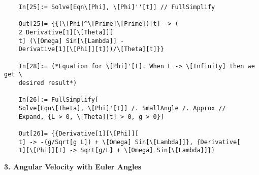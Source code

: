 \documentclass{article}
\theoremstyle{definition}
\begin{document}
\begin{enumerate}[label=(\alph*)]
\begin{lstlisting}
	In[25]:= Solve[Eqn\[Phi], \[Phi]''[t]] // FullSimplify
	
	Out[25]= {{(\[Phi]^\[Prime]\[Prime])[t] -> (
	2 Derivative[1][\[Theta]][
	t] (\[Omega] Sin[\[Lambda]] - 
	Derivative[1][\[Phi]][t]))/\[Theta][t]}}
	
	In[28]:= (*Equation for \[Phi]'[t]. When L -> \[Infinity] then we get \
	desired result*)
	
	In[26]:= FullSimplify[
	Solve[Eqn\[Theta], \[Phi]'[t]] /. SmallAngle /. Approx // 
	Expand, {L > 0, \[Theta][t] > 0, g > 0}]
	
	Out[26]= {{Derivative[1][\[Phi]][
	t] -> -(g/Sqrt[g L]) + \[Omega] Sin[\[Lambda]]}, {Derivative[
	1][\[Phi]][t] -> Sqrt[g/L] + \[Omega] Sin[\[Lambda]]}}
	\end{lstlisting}
\end{enumerate}





\noindent \textbf{3. Angular Velocity with Euler Angles}
\end{document}
